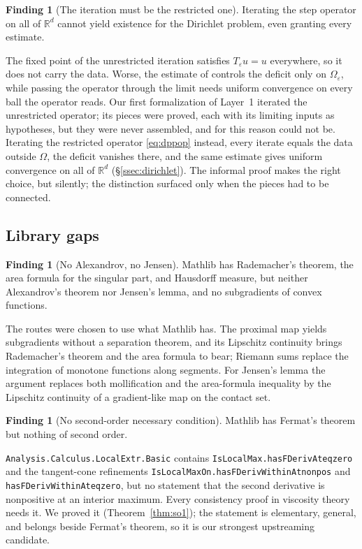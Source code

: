 \documentclass[11pt,reqno]{amsart}
\newcommand{\LEANREF}[1]{\texttt{\small\def\_{\textunderscore\allowbreak}#1}}
\newcommand{\R}{\mathbb{R}}
\newcommand{\eps}{\varepsilon}
\newcommand{\Op}{T_\eps}
\theoremstyle{plain}
\theoremstyle{definition}
\newtheorem{finding}[theorem]{Finding}
\begin{document}
\begin{finding}[The iteration must be the restricted one]\label{find:restricted}
Iterating the step operator on all of $\R^d$ cannot yield existence for the
Dirichlet problem, even granting every estimate.
\end{finding}

The fixed point of the unrestricted iteration satisfies $\Op u = u$
everywhere, so it does not carry the data. Worse, the estimate of
\cite{LPS14} controls the deficit only on $\Omega_\eps$, while passing the
operator through the limit needs uniform convergence on every ball the
operator reads. Our first formalization of Layer~1 iterated the unrestricted
operator; its pieces were proved, each with its limiting inputs as
hypotheses, but they were never assembled, and for this reason could not be.
Iterating the restricted operator \eqref{eq:dppop} instead, every iterate
equals the data outside $\Omega$, the deficit vanishes there, and the same
estimate gives uniform convergence on all of $\R^d$
(\S\ref{ssec:dirichlet}). The informal proof makes the right choice, but
silently; the distinction surfaced only when the pieces had to be connected.

\subsection{Library gaps}

\begin{finding}[No Alexandrov, no Jensen]\label{find:aj}
Mathlib has Rademacher's theorem, the area formula for the singular part, and
Hausdorff measure, but neither Alexandrov's theorem nor Jensen's lemma, and no
subgradients of convex functions.
\end{finding}

The routes were chosen to use what Mathlib has. The proximal map yields
subgradients without a separation theorem, and its Lipschitz continuity brings
Rademacher's theorem and the area formula to bear; Riemann sums replace the
integration of monotone functions along segments. For Jensen's lemma the
argument replaces both mollification and the area-formula inequality by the Lipschitz continuity of a gradient-like map on the contact
set.

\begin{finding}[No second-order necessary condition]\label{find:so}
Mathlib has Fermat's theorem but nothing of second order.
\end{finding}

\texttt{Analysis.Calculus.LocalExtr.Basic} contains
\LEANREF{IsLocalMax.hasFDerivAt\_eq\_zero} and the tangent-cone refinements
\LEANREF{IsLocalMaxOn.hasFDerivWithinAt\_nonpos} and
\LEANREF{hasFDerivWithinAt\_eq\_zero}, but no statement that the second
derivative is nonpositive at an interior maximum. Every consistency proof in
viscosity theory needs it. We proved it (Theorem~\ref{thm:so1}); the statement
is elementary, general, and belongs beside Fermat's theorem, so it is our
strongest upstreaming candidate.
\end{document}

